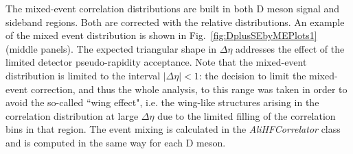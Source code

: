 The mixed-event correlation distributions are built in both D meson signal and sideband regions. Both are
corrected with the relative distributions. An example of the mixed event distribution is shown in Fig.~\ref{fig:DplusSEbyMEPlots1} (middle panels). The expected triangular
shape in $\Delta\eta$ addresses the effect of the limited detector pseudo-rapidity acceptance. Note that the mixed-event distribution is limited to
the interval $\left|\Delta\eta\right|<1$: the decision to limit the mixed-event correction, and thus the whole analysis, to this range was taken in
order to avoid the so-called ``wing effect", i.e. the wing-like structures arising in the correlation distribution at large $\Delta\eta$ due to the
limited filling of the correlation bins in that region. The event mixing is calculated in the \textit{AliHFCorrelator} class and is computed in the same way for each D meson.
